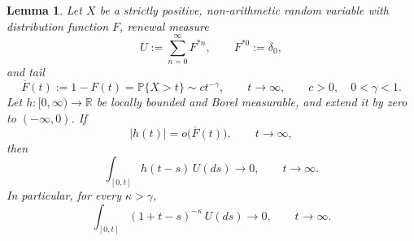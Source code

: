 \documentclass[reqno,final,11pt]{amsart}
\newcommand{\R}{\mathbb R}
\newcommand{\Pbb}{\mathbb P}
\theoremstyle{plain}
\newtheorem{lemma}[theorem]{Lemma}
\theoremstyle{definition}
\theoremstyle{remark}
\numberwithin{equation}{section}
\begin{document}
\begin{lemma}\label{lem:infinite-mean-renewal-negligibility}
Let \(X\) be a strictly positive, non-arithmetic random variable with distribution function \(F\), renewal measure
\[
  U:=\sum_{n=0}^{\infty}F^{*n},
  \qquad F^{*0}:=\delta_0,
\]
and tail
\[
  \overline F(t):=1-F(t)=\Pbb\{X>t\}
  \sim ct^{-\gamma},
  \qquad t\to\infty,
  \qquad c>0,\quad 0<\gamma<1.
\]
Let \(h:[0,\infty)\to\R\) be locally bounded and Borel measurable, and extend it by zero to \((-\infty,0)\). If
\begin{equation}\label{eq:renewal-small-relative-tail}
  |h(t)|=o\bigl(\overline F(t)\bigr),
  \qquad t\to\infty,
\end{equation}
then
\begin{equation}\label{eq:renewal-negligibility-X}
  \int_{[0,t]}h(t-s)\,U(ds)\longrightarrow0,
  \qquad t\to\infty.
\end{equation}
In particular, for every \(\kappa>\gamma\),
\begin{equation}\label{eq:renewal-power-negligibility-X}
  \int_{[0,t]}(1+t-s)^{-\kappa}\,U(ds)\longrightarrow0,
  \qquad t\to\infty.
\end{equation}
\end{lemma}
\end{document}
